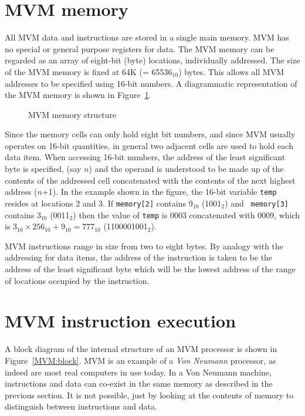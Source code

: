 \section{MVM memory}

All MVM data and instructions are stored in a single main memory. MVM
has no special or general purpose registers for data. The MVM memory can
be regarded as an array of eight-bit (byte) locations, individually
addressed. The size of the MVM memory is fixed at 64K (= 65536$_{10}$)
bytes. This allows all MVM addresses to be specified using 16-bit
numbers.  A diagrammatic representation of the MVM memory is shown in
Figure~\ref{MVM:memory}.

\begin{figure}

\caption{MVM memory structure}
\label{MVM:memory}
\end{figure}

Since the memory cells can only hold eight bit numbers, and since MVM
usually operates on 16-bit quantities, in general two adjacent
cells are used to hold each data item. When accessing 16-bit numbers,
the address of the least significant byte is specified, (say $n$) and
the operand is understood to be made up of the contents of the addressed
cell concatenated with the contents of the next highest address ($n$+1).
In the example shown in the figure, the 16-bit variable {\tt temp}
resides at locations 2 and 3. If {\tt memory[2]} contains 9$_{10}$ (1001$_2$) and {\tt
memory[3]} contains 3$_{10}$ (0011$_2$) then the value of {\tt temp} is 0003
concatenated with 0009, which is $3_{10}\times256_{10} + 9_{10} = 777_{10}$ (1100001001$_2$).

MVM instructions range in size from two to eight bytes. By analogy with
the addressing for data items, the address of the instruction is taken
to be the address of the least significant byte which will be the lowest
address of the range of locations occupied by the instruction.


\section{MVM instruction execution}
A block diagram of the internal structure of an MVM processor is shown
in Figure~\ref{MVM:block}.
MVM is an example of a {\em Von Neumann} processor, as indeed are most
real computers in use today. In a Von Neumann machine, instructions and
data can co-exist in the same memory as described in the previous
section. It is not possible, just by looking at the contents of memory to distinguish
between instructions and data. 

